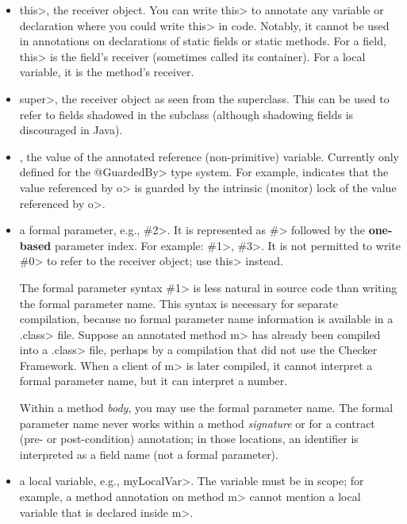 \begin{itemize}
\item
  \<this>, the receiver object.  You can write \<this> to annotate any
  variable or declaration where you could write \<this> in code.
  Notably, it cannot be used in annotations on declarations of
  static fields or static methods.  For a field, \<this> is the field's
  receiver (sometimes called its container).  For a local variable, it is the
  method's receiver.

\item
  \<super>, the receiver object as seen from the superclass.  This can be used
  to refer to fields shadowed in the subclass (although shadowing fields is
  discouraged in Java).

\item
  , the value of the annotated reference (non-primitive) variable.
  Currently only defined for the \<@GuardedBy> type system.
  For example,  indicates that the value
  referenced by \<o> is guarded by the intrinsic (monitor) lock of the value
  referenced by \<o>.

\item
  a formal parameter, e.g., \<\#2>.  It is represented as \<\#> followed by the \textbf{one-based} parameter
  index.  For example: \<\#1>, \<\#3>.  It is not permitted to write \<\#0> to
  refer to the receiver object; use \<this> instead.

  The formal parameter syntax \<\#1> is less natural in source code
  than writing the formal parameter name.  This syntax is necessary for
  separate compilation, because no formal parameter name information is
  available in a \<.class> file.  Suppose an annotated method \<m> has
  already been compiled into a \<.class> file, perhaps by a compilation
  that did not use the Checker Framework.  When a client of \<m> is later
  compiled, it cannot interpret a formal parameter name, but it can
  interpret a number.

  Within a method \emph{body}, you may use the formal parameter name.  The
  formal parameter name never works within a method \emph{signature} or for
  a contract (pre- or post-condition) annotation; in those locations, an
  identifier is interpreted as a field name (not a formal parameter).

\item
  a local variable, e.g., \<myLocalVar>.
  The variable must be in scope; for example, a method annotation on method
  \<m> cannot mention a local variable that is declared inside \<m>.


\end{itemize}

